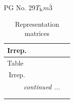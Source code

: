 \documentclass[fleqn,8pt,landscape]{jsarticle}
\begin{document}
\setcounter{MaxMatrixCols}{32}

\renewcommand{\tablename}{Table~}
\renewcommand{\figurename}{Figure~}
\begin{center}
\LARGE
PG No. 29\quad$T_{\rm h}$\quad$m\bar{3}$\quad[ cubic ]
\end{center}
\renewcommand{\arraystretch}{1.2}
\begin{longtable}{ccccccc}
\caption{Representation matrices}
 \\
 \hline \hline
Irrep. &  &  &  &  &  &  \\ \hline \endfirsthead

\multicolumn{6}{l}{\tablename\ \thetable{}} \\
 \hline \hline
Irrep. &  &  &  &  &  &  \\ \hline \endhead

 \hline \hline
\multicolumn{6}{r}{\footnotesize\it continued ...} \\ \endfoot

 \hline \hline
\multicolumn{6}{r}{} \\ \endlastfoot


\end{longtable}
\end{document}
